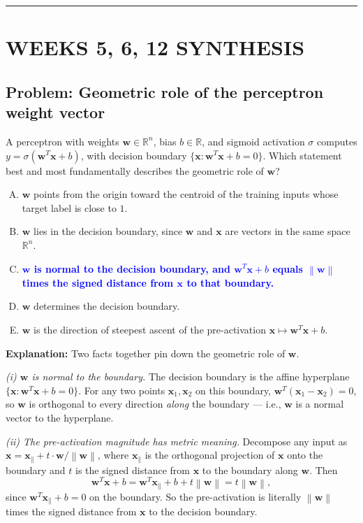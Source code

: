 \documentclass[12pt]{amsart}
\newcommand{\divider}{
  \vspace{-1em}
  \noindent
  \raisebox{-0.15ex}{\textbullet}%
  \hspace{0.5em}%
  \rule[0.5ex]{0.95\textwidth}{1.0pt}%
  \hspace{0.5em}%
  \raisebox{-0.15ex}{\textbullet}%
  \vspace{0em}
}
\newcommand{\norm}[1]{\left\|#1\right\|}
\begin{document}
\divider

\section*{WEEKS 5, 6, 12 SYNTHESIS}

\subsection*{Problem: Geometric role of the perceptron weight vector}

A perceptron with weights $\mathbf{w} \in \mathbb{R}^n$, bias
$b \in \mathbb{R}$, and sigmoid activation $\sigma$ computes
$y = \sigma(\mathbf{w}^T \mathbf{x} + b)$, with decision boundary
$\{\mathbf{x} : \mathbf{w}^T \mathbf{x} + b = 0\}$. Which statement best
and most fundamentally describes the geometric role of $\mathbf{w}$?

\begin{enumerate}[(A)]
    \item $\mathbf{w}$ points from the origin toward the centroid of the training inputs whose target label is close to $1$.
    \item $\mathbf{w}$ lies in the decision boundary, since $\mathbf{w}$ and $\mathbf{x}$ are vectors in the same space $\mathbb{R}^n$.
    \item \textcolor{blue}{\textbf{$\mathbf{w}$ is normal to the decision boundary, and $\mathbf{w}^T \mathbf{x} + b$ equals $\norm{\mathbf{w}}$ times the signed distance from $\mathbf{x}$ to that boundary.}}
    \item $\mathbf{w}$ determines the decision boundary.
    \item $\mathbf{w}$ is the direction of steepest ascent of the pre-activation $\mathbf{x} \mapsto \mathbf{w}^T \mathbf{x} + b$.
\end{enumerate}

\textbf{Explanation:}
Two facts together pin down the geometric role of $\mathbf{w}$.

\emph{(i) $\mathbf{w}$ is normal to the boundary.} The decision boundary
is the affine hyperplane $\{\mathbf{x} : \mathbf{w}^T \mathbf{x} + b = 0\}$.
For any two points $\mathbf{x}_1, \mathbf{x}_2$ on this boundary,
$\mathbf{w}^T (\mathbf{x}_1 - \mathbf{x}_2) = 0$, so $\mathbf{w}$ is
orthogonal to every direction \emph{along} the boundary --- i.e.,
$\mathbf{w}$ is a normal vector to the hyperplane.

\emph{(ii) The pre-activation magnitude has metric meaning.} Decompose
any input as
$\mathbf{x} = \mathbf{x}_\parallel + t \cdot \mathbf{w}/\norm{\mathbf{w}}$,
where $\mathbf{x}_\parallel$ is the orthogonal projection of $\mathbf{x}$
onto the boundary and $t$ is the signed distance from $\mathbf{x}$ to
the boundary along $\mathbf{w}$. Then
$$
\mathbf{w}^T \mathbf{x} + b
= \mathbf{w}^T \mathbf{x}_\parallel + b + t \norm{\mathbf{w}}
= t \norm{\mathbf{w}},
$$
since $\mathbf{w}^T \mathbf{x}_\parallel + b = 0$ on the boundary. So the
pre-activation is literally $\norm{\mathbf{w}}$ times the signed distance
from $\mathbf{x}$ to the decision boundary.
\end{document}

